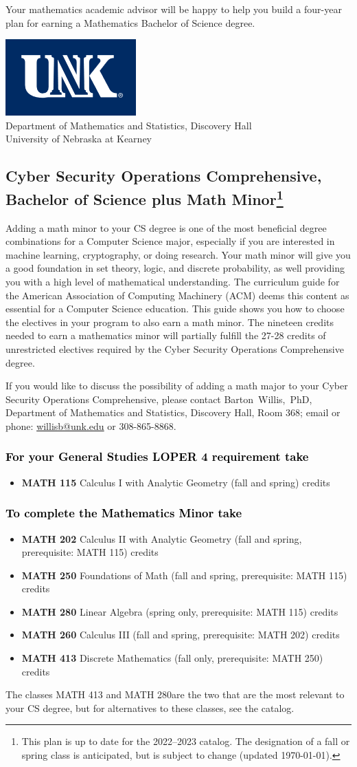 \documentclass[10pt]{article}
\makeatletter
\newenvironment{mypar}[2]
   {\begin{list}{}%
     {\setlength\leftmargin{#1}
     \setlength\rightmargin{#2}}
     \item[]}
   {\end{list}}
\newcommand{\calcone}{\textbf{MATH 115} Calculus I with Analytic Geometry (fall and spring) \dotfill 5 credits}
\newcommand{\calctwo}{\textbf{MATH 202} Calculus II with Analytic Geometry (fall and spring, prerequisite: MATH 115) \dotfill 5 credits }
\newcommand{\foundations}{\textbf{MATH 250} Foundations of Math (fall and spring, prerequisite: MATH 115)  \dotfill 3 credits}
\newcommand{\calcthree}{\textbf{MATH 260} Calculus III  (fall and spring, prerequisite: MATH 202) \dotfill 5 credits}
\newcommand{\linear}{\textbf{MATH 280} Linear Algebra (spring only, prerequisite: MATH 115) \dotfill 3 credits}
\newcommand{\linearshort}{MATH 280}
\newcommand{\discrete}{\textbf{MATH 413} Discrete Mathematics  (fall only, prerequisite: MATH 250)\dotfill 3 credits}
\newcommand{\discreteshort}{MATH 413}
\newcommand{\contactbw}{\mbox{Barton Willis, PhD}, Department of Mathematics and Statistics,  Discovery Hall, Room 368;
email or phone: \href{mailto:willisb@unk.edu}{willisb@unk.edu} or 308-865-8868.}
\newcommand{\forinfo}[2]{If you would like to discuss the possibility of adding a math {#1} to your {#2}, please contact \contactbw}
\newcommand{\catalog}{2022--2023 }
\newcommand{\myfootnote}{\footnote{This plan is up to date for  the \catalog catalog. The designation of a fall or spring class is 
anticipated, but  is subject to change (updated  \today).}}
\newcommand{\myheading}{
\begin{flushleft}
\includegraphics[scale=0.35]{unk-logo}\\
\setcounter{footnote}{0}
\vspace{0.25in}
 \textcolor{unkblue}{Department of Mathematics and Statistics, Discovery Hall} \\
  \textcolor{unkblue}{University of Nebraska at Kearney}
\end{flushleft}}
\makeatother
\begin{document}
\begin{mypar}{0.5cm}{0.5cm}  Your mathematics academic advisor will be happy to help you build a four-year plan for earning a Mathematics Bachelor of Science degree. \end{mypar}
\newpage



\myheading

\subsection*{\textbf{\textcolor{unkblue}{Cyber Security Operations Comprehensive, Bachelor of Science plus Math Minor\myfootnote}}}

Adding a math minor to your CS degree is one of the most beneficial degree combinations for a Computer Science major, especially if you are interested in machine learning, cryptography,  or doing research.  Your math minor will give you a good foundation in set theory, logic, and discrete probability, as well providing you with a high level of mathematical understanding. The curriculum guide for the American Association of Computing Machinery (ACM) deems  this content  as essential for  a Computer Science education. This guide shows you how to choose the electives in your program to also earn a math minor. The nineteen  credits needed to earn a mathematics minor will partially fulfill the 27-28  credits of unrestricted electives required by the 
Cyber Security Operations Comprehensive degree.

 
 \forinfo{major}{Cyber Security Operations Comprehensive}


\vspace{-0.1in}

\subsubsection*{\textcolor{black}{For  your General Studies LOPER 4 requirement take}}
\begin{itemize}
\item  \calcone
\end{itemize}

\subsubsection*{\textcolor{black}{To complete the Mathematics Minor take}}

\begin{itemize}
\item \calctwo
\item \foundations
\item \linear
\item \calcthree
\item \discrete
\end{itemize}
\begin{mypar}{0.5cm}{0.5cm}{The classes \discreteshort{} and \linearshort are the two that are the most 
   relevant to your  CS degree, but for alternatives to these classes, see the catalog.} \end{mypar}
\end{document}
